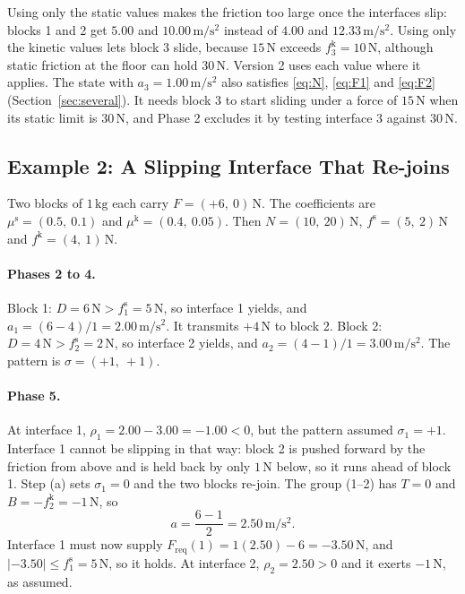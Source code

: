 \documentclass[11pt,a4paper]{article}
\newcommand{\fs}{f^{\mathrm{s}}}
\newcommand{\fkin}{f^{\mathrm{k}}}
\newcommand{\mus}{\mu^{\mathrm{s}}}
\newcommand{\muk}{\mu^{\mathrm{k}}}
\newcommand{\Freq}{F_{\mathrm{req}}}
\begin{document}
Using only the static values makes the friction too large once the interfaces slip: blocks 1 and 2 get $5.00$ and $10.00\,\mathrm{m/s^2}$ instead of $4.00$ and $12.33\,\mathrm{m/s^2}$. Using only the kinetic values lets block 3 slide, because $15\,\mathrm{N}$ exceeds $\fkin_3=10\,\mathrm{N}$, although static friction at the floor can hold $30\,\mathrm{N}$. Version 2 uses each value where it applies. The state with $a_3=1.00\,\mathrm{m/s^2}$ also satisfies \eqref{eq:N}, \eqref{eq:F1} and \eqref{eq:F2} (Section~\ref{sec:several}). It needs block 3 to start sliding under a force of $15\,\mathrm{N}$ when its static limit is $30\,\mathrm{N}$, and Phase 2 excludes it by testing interface 3 against $30\,\mathrm{N}$.

\subsection{Example 2: A Slipping Interface That Re-joins}\label{sec:ex2}

Two blocks of $1\,\mathrm{kg}$ each carry $F=(+6,\ 0)\,\mathrm{N}$. The coefficients are $\mus=(0.5,\ 0.1)$ and $\muk=(0.4,\ 0.05)$. Then $N=(10,\ 20)\,\mathrm{N}$, $\fs=(5,\ 2)\,\mathrm{N}$ and $\fkin=(4,\ 1)\,\mathrm{N}$.

\paragraph{Phases 2 to 4.} Block 1: $D=6\,\mathrm{N}>\fs_1=5\,\mathrm{N}$, so interface 1 yields, and $a_1=(6-4)/1=2.00\,\mathrm{m/s^2}$. It transmits $+4\,\mathrm{N}$ to block 2. Block 2: $D=4\,\mathrm{N}>\fs_2=2\,\mathrm{N}$, so interface 2 yields, and $a_2=(4-1)/1=3.00\,\mathrm{m/s^2}$. The pattern is $\sigma=(+1,\ +1)$.

\paragraph{Phase 5.} At interface 1, $\rho_1=2.00-3.00=-1.00<0$, but the pattern assumed $\sigma_1=+1$. Interface 1 cannot be slipping in that way: block 2 is pushed forward by the friction from above and is held back by only $1\,\mathrm{N}$ below, so it runs ahead of block 1. Step (a) sets $\sigma_1=0$ and the two blocks re-join. The group (1--2) has $T=0$ and $B=-\fkin_2=-1\,\mathrm{N}$, so
\[
a=\frac{6-1}{2}=2.50\,\mathrm{m/s^2}.
\]
Interface 1 must now supply $\Freq(1)=1(2.50)-6=-3.50\,\mathrm{N}$, and $|{-3.50}|\le \fs_1=5\,\mathrm{N}$, so it holds. At interface 2, $\rho_2=2.50>0$ and it exerts $-1\,\mathrm{N}$, as assumed.
\end{document}
